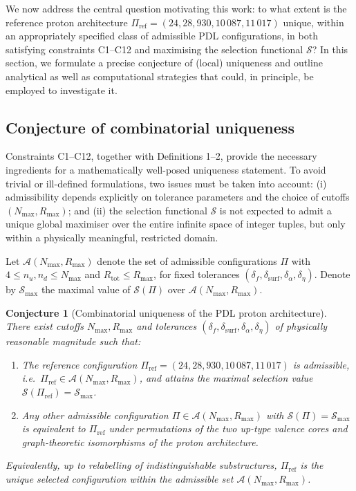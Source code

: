 \documentclass[11pt,a4paper]{article}
\newtheorem{conjecture}{Conjecture}
\begin{document}
We now address the central question motivating this work: to what extent is the reference proton architecture $\Pi_{\mathrm{ref}}=(24,28,930,10\,087,11\,017)$ unique, within an appropriately specified class of admissible PDL configurations, in both satisfying constraints C1–C12 and maximising the selection functional $\mathcal{S}$? In this section, we formulate a precise conjecture of (local) uniqueness and outline analytical as well as computational strategies that could, in principle, be employed to investigate it.

\subsection{Conjecture of combinatorial uniqueness}

Constraints C1–C12, together with Definitions 1–2, provide the necessary ingredients for a mathematically well-posed uniqueness statement. To avoid trivial or ill-defined formulations, two issues must be taken into account: (i) admissibility depends explicitly on tolerance parameters and the choice of cutoffs $(N_{\max},R_{\max})$; and (ii) the selection functional $\mathcal{S}$ is not expected to admit a unique global maximiser over the entire infinite space of integer tuples, but only within a physically meaningful, restricted domain.

Let $\mathcal{A}(N_{\max},R_{\max})$ denote the set of admissible configurations $\Pi$ with $4\leq n_u,n_d\leq N_{\max}$ and $R_{\mathrm{tot}}\leq R_{\max}$, for fixed tolerances $(\delta_f,\delta_{\mathrm{surf}},\delta_{\alpha},\delta_{\eta})$. Denote by $\mathcal{S}_{\max}$ the maximal value of $\mathcal{S}(\Pi)$ over $\mathcal{A}(N_{\max},R_{\max})$.

\begin{conjecture}[Combinatorial uniqueness of the PDL proton architecture]
\label{conj:uniqueness}
There exist cutoffs $N_{\max},R_{\max}$ and tolerances $(\delta_f,\delta_{\mathrm{surf}},\delta_{\alpha},\delta_{\eta})$ of physically reasonable magnitude such that:
\begin{enumerate}[label=(U\arabic*)]
\item The reference configuration $\Pi_{\mathrm{ref}}=(24,28,930,10\,087,11\,017)$ is admissible, i.e.\ $\Pi_{\mathrm{ref}}\in\mathcal{A}(N_{\max},R_{\max})$, and attains the maximal selection value $\mathcal{S}(\Pi_{\mathrm{ref}})=\mathcal{S}_{\max}$.
\item Any other admissible configuration $\Pi\in\mathcal{A}(N_{\max},R_{\max})$ with $\mathcal{S}(\Pi)=\mathcal{S}_{\max}$ is equivalent to $\Pi_{\mathrm{ref}}$ under permutations of the two up-type valence cores and graph-theoretic isomorphisms of the proton architecture.
\end{enumerate}
Equivalently, up to relabelling of indistinguishable substructures, $\Pi_{\mathrm{ref}}$ is the unique selected configuration within the admissible set $\mathcal{A}(N_{\max},R_{\max})$.
\end{conjecture}
\end{document}

